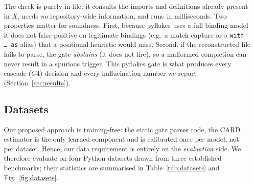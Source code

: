 \documentclass[10pt,conference]{IEEEtran}
\newcommand{\new}[1]{{\color{blue}#1}}
\begin{document}
\new{The check is purely in-file: it consults the imports and
definitions already present in $X$, needs \emph{no} repository-wide information, and runs in milliseconds. Two properties matter for
soundness. First, because pyflakes uses a full binding model it does not
false-positive on legitimate bindings (e.g.\ a match capture or a \texttt{with
\dots\ as} alias) that a positional heuristic would miss. Second, if the
reconstructed file fails to parse, the gate \emph{abstains} (it does not fire), so
a malformed completion can never result in a spurious trigger. This pyflakes
gate is what produces every cascade ($C4$)
decision and every hallucination number we report (Section~\ref{sec:results}).}

\subsection{Datasets}
\label{sec:dataset}

Our proposed approach is training-free: the static gate parses code, the CARD estimator is
the only learned component and is calibrated once per model, not per dataset. Hence,
our data requirement is entirely on the \emph{evaluation} side. We therefore
evaluate on four Python datasets drawn from three established benchmarks; their
statistics are summarised in Table~\ref{tab:datasets} and
Fig.~\ref{fig:datasets}.

\begin{table}[tb]
\caption{Evaluation surfaces. ``GT lines'' is the ground-truth completion length
in lines; ``single'' is the fraction of single-line targets. Scoring mode is the
span the prediction is truncated to before computing accuracy.
(Section~\ref{sec:metrics}).}
\label{tab:datasets}
\centering
\footnotesize
\setlength{\tabcolsep}{3.5pt}
\end{table}
\end{document}
